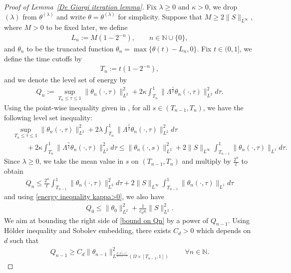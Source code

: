 \documentclass[reqno]{amsart}%
\theoremstyle{definition}
\theoremstyle{remark}
\numberwithin{equation}{section}
\newcommand{\thetalambda}{\theta^{(\lambda)}}
\newcommand{\1}{\mathbf{1}}
\newcommand{\N}{\mathbb N}
\numberwithin{equation}{section}
\numberwithin{theorem}{section}
\numberwithin{figure}{section}
\begin{document}
\begin{proof}[Proof of Lemma~\ref{De Giorgi iteration lemma}]
Fix $\lambda\ge0$ and $\kappa>0$, we drop $(\lambda)$ from $\thetalambda$ and write $\theta=\thetalambda$ for simplicity. Suppose that $M\ge2\|S\|_{L^\infty}$, where $M>0$ to be fixed later, we define
\begin{align*}
 L_{n}:=M(1-2^{-n}),\qquad n\in\N\cup\{0\},
\end{align*}
and $\theta_{n}$ to be the truncated function $\theta_n=\max\{\theta(t)- L_{n},0\}$. Fix $t\in(0,1]$, we define the time cutoffs by
\begin{align*}
T_{n}:=t(1-2^{-n}),
\end{align*}
and we denote the level set of energy by
\begin{align*}
Q_{n}:=\sup_{T_{n}\le\tau\le1}\|\theta_n(\cdot,\tau)\|^2_{L^2}+2\kappa\int_{T_{n}}^1\|\Lambda^{\frac{\gamma}{2}}\theta_{n}(\cdot,\tau)\|^2_{L^2}d\tau.
\end{align*}
Using the point-wise inequality given in \cite[Proposition 2.3]{CC04}, for all $s\in(T_{n-1},T_{n})$, we have the following level set inequality:
\begin{align*}
&\sup_{T_{n}\le\tau\le1}\|\theta_{n}(\cdot,\tau)\|^2_{L^2}+2\lambda\int_{T_{n}}^1\|\Lambda^{\frac{1}{2}}\theta_{n}(\cdot,\tau)\|^2_{L^2}d\tau\\
&\qquad+2\kappa\int_{T_{n}}^1\|\Lambda^{\frac{\gamma}{2}}\theta_{n}(\cdot,\tau)\|^2_{L^2}d\tau\le\|\theta_{n}(\cdot,s)\|^2_{L^2}+2\|S\|_{L^\infty}\int_{T_{n-1}}^1\|\theta_{n}(\cdot,\tau)\|_{L^1}d\tau.
\end{align*}
Since $\lambda\ge0$, we take the mean value in $s$ on $(T_{n-1},T_{n})$ and multiply by $\frac{2^n}{t}$ to obtain
\begin{align}\label{bound on Qn}
Q_{n}\le \frac{2^{n}}{t}\int_{T_{n-1}}^1\|\theta_{n}(\cdot,\tau)\|^2_{L^2}d\tau+2\|S\|_{L^\infty}\int_{T_{n-1}}^1\|\theta_{n}(\cdot,\tau)\|_{L^1}d\tau
\end{align}
and using \eqref{energy inequality kappa>0}, we also have
\begin{align}\label{bound on Q0}
Q_{0}\le\|\theta_0\|^2_{L^2}+\frac{1}{c_0\kappa}\|S\|^2_{L^2}.
\end{align}
We aim at bounding the right side of \eqref{bound on Qn} by a power of $Q_{n-1}$. Using H\"{o}lder inequality and Sobolev embedding, there exists $C_d>0$ which depends on $d$ such that
\begin{align}\label{bound on Qn-1 using theta n-1}
Q_{n-1}\ge C_{d}\|\theta_{n-1}\|^2_{L^\frac{2(d+1)}{d+1-\gamma}(\Omega\times[T_{n-1},1])}\qquad\forall n\in\N.

\end{align}
\end{proof}
\end{document}

